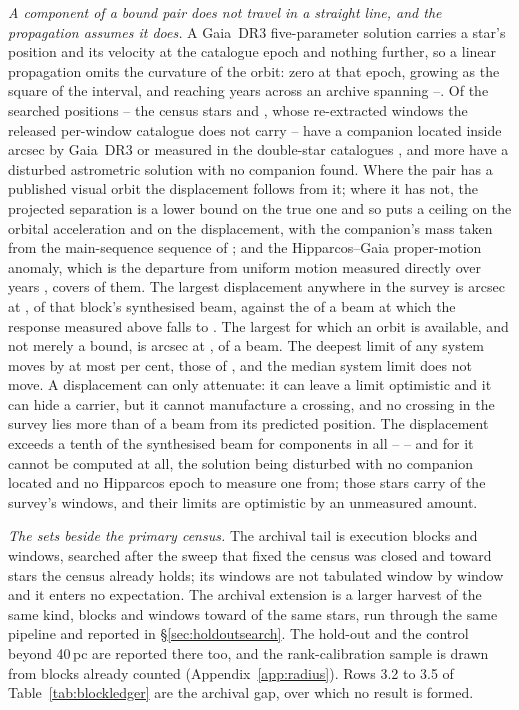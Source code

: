 \emph{A component of a bound pair does not travel in a straight line, and the
propagation assumes it does.} A Gaia~DR3 five-parameter solution carries a
star's position and its velocity at the catalogue epoch and nothing further,
so a linear propagation omits the curvature of the orbit: zero at that epoch,
growing as the square of the interval, and reaching years across an archive
spanning \OmEpochLo--\OmEpochHi. Of the \OmNStar{} searched positions --
the \OmNCensusStar{} census stars and \OmXStar, whose re-extracted windows
the released per-window catalogue does not carry --
\OmNComponent{} have a companion located inside \OmRadius{} arcsec by
Gaia~DR3 or measured in the double-star catalogues
\citep{wds,orb6}, and \OmNIndOnly{} more
have a disturbed astrometric solution with no companion found. Where the pair
has a published visual orbit the displacement follows from it; where it has
not, the projected separation is a lower bound on the true one and so puts a
ceiling on the orbital acceleration and on the displacement, with the
companion's mass taken from the main-sequence sequence of
\citet{pecaut2013}; and the
Hipparcos--Gaia proper-motion anomaly, which is the departure from uniform
motion measured directly over \OmHGInterval{} years
\citep{kervella2022}, covers \OmNPma{} of
them. The largest displacement anywhere in the survey is \OmWorstArcsec{}
arcsec at \OmWorstStar, \OmWorstBeams{} of that block's synthesised beam,
against the \SensPxLargeBeams{} of a beam at which the response measured
above falls to \SensPxLargePred. The largest for which an orbit is available, and not merely a bound, is
\OmMeasArcsec{} arcsec at \OmMeasStar, \OmMeasBeams{} of a beam. The deepest
limit of any system moves by at most \OmSysMovedMaxPct{} per cent, those of
\OmSysMovedStars, and the median system limit does not move. A displacement
can only attenuate: it can leave a limit optimistic and it can hide a
carrier, but it cannot manufacture a crossing, and no crossing in the survey
lies more than \OmCrossWorstBeams{} of a beam from its predicted position.
The displacement exceeds a tenth of the synthesised beam for \OmNTenth{}
components in all -- \OmTenthStars{} -- and for \OmFlagStars{} it cannot be
computed at all, the solution being disturbed with no companion located and no
Hipparcos epoch to measure one from; those \OmNFlag{} stars carry
\OmNWinFlag{} of the survey's windows, and their limits are optimistic by an
unmeasured amount.

\emph{The sets beside the primary census.} The archival tail is
\LdgExtTail{} execution blocks and \LdgExtTailWin{} windows, searched after
the sweep that fixed the census was closed and toward stars the census
already holds; its windows are not tabulated window by window and it enters
no expectation. The archival extension is a larger harvest of the same kind,
\LdgExtEB{} blocks and \LdgExtWin{} windows toward \LdgExtStars{} of the same
stars, run through the same pipeline and reported in
\S\ref{sec:holdoutsearch}. The hold-out and the control beyond 40\,pc are
reported there too, and the rank-calibration sample is drawn from blocks
already counted (Appendix~\ref{app:radius}). Rows 3.2 to 3.5 of
Table~\ref{tab:blockledger} are the archival gap, over which no result is
formed.

